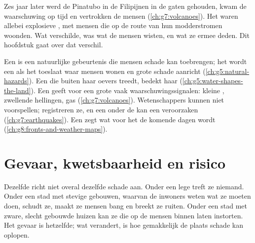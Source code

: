 Zes jaar later werd de Pinatubo in de Filipijnen in de gaten gehouden,
kwam de waarschuwing op tijd en vertrokken de mensen
(\cref{ch:g7:volcanoes}). Het waren allebei explosieve , met
mensen die op de route van hun modderstromen woonden. Wat verschilde, was
wat de mensen wisten, en wat ze ermee deden. Dit hoofdstuk gaat over dat
verschil.

\begin{recall}
Een \emph{} is een natuurlijke gebeurtenis die mensen schade
kan toebrengen; het wordt een \emph{} als het toeslaat waar
mensen wonen en grote schade aanricht (\cref{ch:g5:natural-hazards}). Een
 die buiten haar oevers treedt, bedekt haar 
(\cref{ch:g5:water-shapes-the-land}). Een  geeft voor een grote
 vaak waarschuwingssignalen: kleine , zwellende
hellingen, gas (\cref{ch:g7:volcanoes}). Wetenschappers kunnen
 niet voorspellen;  registreren ze, en een
 onder de  kan een  veroorzaken
(\cref{ch:g7:earthquakes}). Een  zegt wat voor  het de
komende dagen wordt (\cref{ch:g8:fronts-and-weather-maps}).
\end{recall}

\section{Gevaar, kwetsbaarheid en risico}

Dezelfde  richt niet overal dezelfde schade aan. Onder een lege
 treft ze niemand. Onder een stad met stevige gebouwen, waarvan de
inwoners weten wat ze moeten doen, schudt ze, maakt ze mensen bang en
breekt ze ruiten. Onder een stad met zware, slecht gebouwde huizen kan ze
die op de mensen binnen laten instorten. Het gevaar is hetzelfde; wat
verandert, is hoe gemakkelijk de plaats schade kan oplopen.

